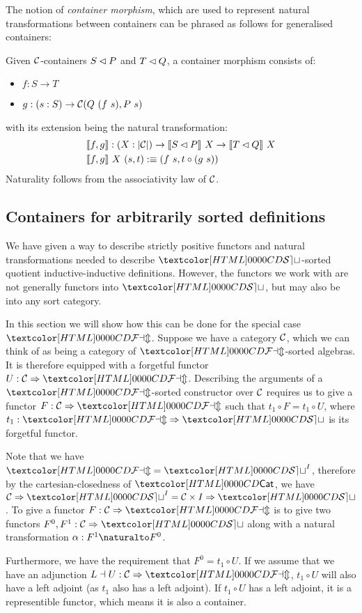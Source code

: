 The notion of \emph{container morphism}, which are used to represent
natural transformations between containers can be phrased as follows
for generalised containers:
\begin{definition}
  Given $\mathcal{C}$-containers $S \lhd P$ and $T \lhd Q$, a container
  morphism consists of:
  \begin{itemize}
  \item $f : S \to T$
  \item $g : (s : S) \to \Cc(Q\ (f\ s), P\ s)$
  \end{itemize}
  with its extension being the natural transformation:
  \begin{align*}
    &\llbracket f , g \rrbracket : (X : | \mathcal{C} |) \to \llbracket S \lhd P \rrbracket\ X \to \llbracket T \lhd Q \rrbracket\ X \\
    &\llbracket f , g \rrbracket\ X\ (s , t) :\equiv (f\ s , t \circ (g\ s))
  \end{align*}
  Naturality follows from the associativity law of $\mathcal{C}$.
\end{definition}

\subsection{Containers for arbitrarily sorted definitions}
We have given a way to describe strictly positive functors and natural
transformations needed to describe $\SET$-sorted quotient
inductive-inductive definitions. However, the functors we work with
are not generally functors into $\SET$, but may also be into any sort
category.

In this section we will show how this can be done for the special case
$\FAM$. Suppose we have a category $\mathcal{C}$, which we can think of as
being a category of $\FAM$-sorted algebras. It is therefore equipped
with a forgetful functor $U : \Func{\Cc}{\FAM}$. Describing the
arguments of a $\FAM$-sorted constructor over $\mathcal{C}$ requires us to
give a functor $F : \Func{\Cc}{\FAM}$ such that
$t_1 \circ F = t_1 \circ U$, where $t_1 : \Func{\FAM}{\SET}$ is its
forgetful functor.

Note that we have $\FAM = \SET^I$, therefore by the
cartesian-closedness of $\Cat$, we have
$\Func{\Cc}{\SET^I} = \Func{\Cc \times I}{\SET}$. To give a functor
$F : \Func{\Cc}{\FAM}$ is to give two functors
$F^0, F^1 : \Func{\Cc}{\SET}$ along with a natural transformation
$\alpha : \Nat{F^1}{F^0}$.

Furthermore, we have the requirement that $F^0 = t_1 \circ U$. If we
assume that we have an adjunction $L \dashv U : \Func{\Cc}{\FAM}$,
$t_1 \circ U$ will also have a left adjoint (as $t_1$ also has a left
adjoint). If $t_1 \circ U$ has a left adjoint, it is a representible
functor, which means it is also a container.

